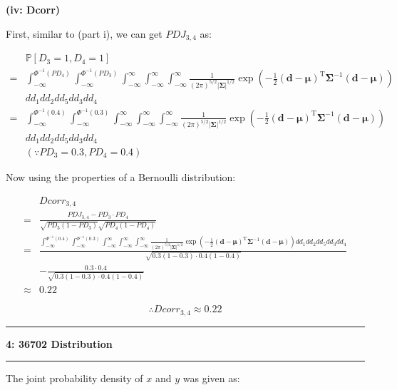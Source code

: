 \documentclass[11pt]{article}
\newcommand\question[2]{\vspace{.25in}\hrule\textbf{#1: #2}\vspace{.5em}\hrule\vspace{.10in}}
\renewcommand\part[1]{\vspace{.10in}\textbf{(#1)}}
\renewcommand{\P}{\mathbb{P}}
\begin{document}
\part{iv: Dcorr}

First, similar to (part i), we can get $PDJ_{3, 4}$ as:

$$
\begin{aligned}
& \P[D_3 = 1, D_4 = 1] \\
=& \int_{-\infty}^{\Phi^{-1}(PD_4)}
\int_{-\infty}^{\Phi^{-1}(PD_3)}
\int_{-\infty}^{\infty}
\int_{-\infty}^{\infty}
\int_{-\infty}^{\infty}
\frac{1}{(2\pi)^{5/2}|\mathbf{\Sigma}|^{1/2}}\exp\left(-\frac{1}{2}(\mathbf{d}-\mathbf{\mu})^{\mathrm{T}}\mathbf{\Sigma}^{-1}(\mathbf{d}-\mathbf{\mu})\right) \\
& d d_1 d d_2 d d_5 d d_3 d d_4 \\
=& \int_{-\infty}^{\Phi^{-1}(0.4)}
\int_{-\infty}^{\Phi^{-1}(0.3)}
\int_{-\infty}^{\infty}
\int_{-\infty}^{\infty}
\int_{-\infty}^{\infty}
\frac{1}{(2\pi)^{5/2}|\mathbf{\Sigma}|^{1/2}}\exp\left(-\frac{1}{2}(\mathbf{d}-\mathbf{\mu})^{\mathrm{T}}\mathbf{\Sigma}^{-1}(\mathbf{d}-\mathbf{\mu})\right) \\
& d d_1 d d_2 d d_5 d d_3 d d_4 \\
&(\because PD_3 = 0.3, PD_4 = 0.4)
\end{aligned}
$$

Now using the properties of a Bernoulli distribution:

$$
\begin{aligned}
&Dcorr_{3, 4} \\
=& \frac{PDJ_{3, 4} - PD_3 \cdot PD_4}
{\sqrt{PD_3 (1 - PD_3)}\sqrt{PD_4 (1 - PD_4)}} \\
=& \frac{\int_{-\infty}^{\Phi^{-1}(0.4)}
\int_{-\infty}^{\Phi^{-1}(0.3)}
\int_{-\infty}^{\infty}
\int_{-\infty}^{\infty}
\int_{-\infty}^{\infty}
\frac{1}{(2\pi)^{5/2}|\mathbf{\Sigma}|^{1/2}}\exp\left(-\frac{1}{2}(\mathbf{d}-\mathbf{\mu})^{\mathrm{T}}\mathbf{\Sigma}^{-1}(\mathbf{d}-\mathbf{\mu})\right)
d d_1 d d_2 d d_5 d d_3 d d_4}
{\sqrt{0.3 (1 - 0.3) \cdot 0.4 (1 - 0.4)}} \\
& - \frac{0.3 \cdot 0.4}{\sqrt{0.3 (1 - 0.3) \cdot 0.4 (1 - 0.4)}} \\
\approx & 0.22
\end{aligned}
$$

$$
\therefore
Dcorr_{3, 4}
\approx 0.22
$$

\question{4}{36702 Distribution}

The joint probability density of $x$ and $y$ was given as:
\end{document}
